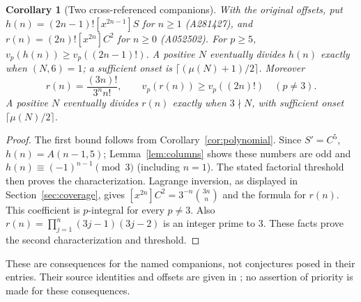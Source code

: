 \documentclass[11pt]{article}
\newtheorem{corollary}[theorem]{Corollary}
\newcommand{\coeff}[2]{[#1]#2}
\begin{document}
\begin{corollary}[Two cross-referenced companions]\label{cor:companions}
With the original offsets, put
$h(n)=(2n-1)!\coeff{x^{2n-1}}S$ for $n\geq1$ (A281427), and
$r(n)=(2n)!\coeff{x^{2n}}{C^2}$ for $n\geq0$ (A052502).
For $p\geq5$, $v_p(h(n))\geq v_p((2n-1)!)$.
A positive $N$ eventually divides $h(n)$ exactly when $(N,6)=1$;
a sufficient onset is $\lceil(\mu(N)+1)/2\rceil$.
Moreover
\[
r(n)=\frac{(3n)!}{3^n n!},\qquad
v_p(r(n))\geq v_p((2n)!)\quad(p\ne3).
\]
A positive $N$ eventually divides $r(n)$ exactly when $3\nmid N$,
with sufficient onset $\lceil\mu(N)/2\rceil$.
\end{corollary}
\begin{proof}
The first bound follows from Corollary~\ref{cor:polynomial}.
Since $S'=C^5$, $h(n)=A(n-1,5)$; Lemma~\ref{lem:columns} shows these
numbers are odd and $h(n)\equiv(-1)^{n-1}\pmod3$ (including $n=1$).
The stated factorial threshold then proves the characterization.
Lagrange inversion, as displayed in Section~\ref{sec:coverage}, gives
$\coeff{x^{2n}}{C^2}=3^{-n}\binom{3n}{n}$ and the formula for $r(n)$.
This coefficient is $p$-integral for every $p\ne3$.
Also $r(n)=\prod_{j=1}^n(3j-1)(3j-2)$ is an integer prime to $3$.
These facts prove the second characterization and threshold.
\end{proof}
These are consequences for the named companions, not conjectures posed
in their entries. Their source identities and offsets are given in
\cite{companions}; no assertion of priority is made for these consequences.
\end{document}
